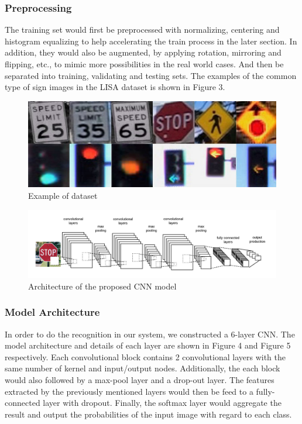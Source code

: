 \documentclass[conference]{IEEEtran}
\begin{document}
\subsubsection{Preprocessing}
The training set would first be preprocessed with normalizing, centering and histogram equalizing to help accelerating the train process in the later section. In addition, they would also be augmented, by applying rotation, mirroring and flipping, etc., to mimic more possibilities in the real world cases. And then be separated into training, validating and testing sets. The examples of the common type of sign images in the LISA dataset is shown in Figure 3.

\begin{figure}[H]
\centering
  \begin{minipage}{.4\textwidth}
    \centering
    \includegraphics[width=0.8\linewidth]{dataset3.jpg}
    \caption{Example of dataset}
    \label{fig:fig_3}
  \end{minipage}
\end{figure}

\begin{figure}[H]
\begin{center}
\centering
\includegraphics[width=0.9\linewidth]{conv.png}
\caption{Architecture of the proposed CNN model}\end{center}
\label{fig:long}
\end{figure}

\subsubsection{Model Architecture}
In order to do the recognition in our system, we constructed a 6-layer CNN. The model architecture and details of each layer are shown in Figure 4 and Figure 5 respectively. Each convolutional block contains 2 convolutional layers with the same number of kernel and input/output nodes. Additionally, the each block would also followed by a max-pool layer and a drop-out layer. The features extracted by the previously mentioned layers would then be feed to a fully-connected layer with dropout. Finally, the softmax layer would aggregate the result and output the probabilities of the input image with regard to each class.
\end{document}
